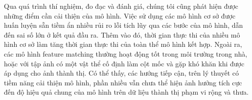 Qua quá trình thí nghiệm, đo đạc và đánh giá, chúng tôi cũng phát hiện được những điểm cần cải thiện của mô hình. Việc sử dụng các mô hình cơ sở được huấn luyện sẵn tiềm ẩn nhiều rủi ro lỗi tích lũy qua các bước của mô hình, dẫn đến sai số lớn ở kết quả đầu ra. Thêm vào đó, thời gian thực thi của nhiều mô hình cơ sở làm tăng thời gian thực thi của toàn thể mô hình kết hợp. Ngoài ra, các mô hình feature matching thường hoạt động tốt trong môi trường trong nhà, hoặc với tập ảnh có một vật thể cố định làm cột mốc và gặp khó khăn khi được áp dụng cho ảnh thành thị. Có thể thấy, các hướng tiếp cận, trên lý thuyết có tiềm năng cải thiện mô hình, phần nhiều vẫn chưa thể hiện ảnh hưởng tích cực đến độ hiệu quả chung của mô hình trên dữ liệu thành thị phạm vi rộng và thưa.
